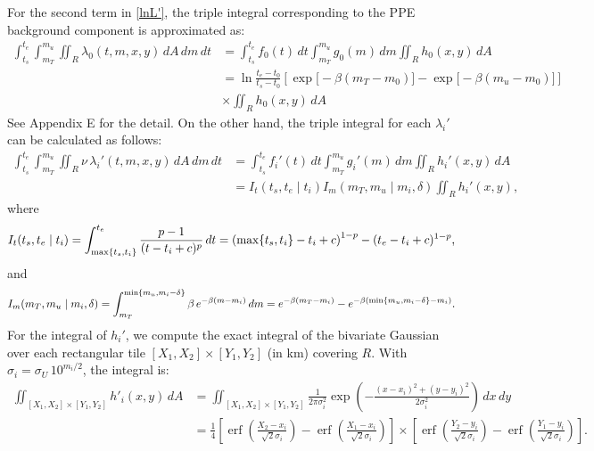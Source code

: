 \documentclass[extra,mreferee]{gji}
\theoremstyle{lemma}
\begin{document}
For the second term in \eqref{lnL'}, the triple integral corresponding to the PPE background component is approximated as:
\begin{equation*}
\begin{aligned}
\int_{t_s}^{t_e} \int_{m_T}^{m_u} \iint_R \lambda_0(t, m, x, y)\, dA\, dm\, dt 
&= \int_{t_s}^{t_e} f_0(t)\, dt \int_{m_T}^{m_u} g_0(m)\, dm \iint_R h_0(x, y)\, dA \\
&= \ln \frac{t_e - t_0}{t_s - t_0} \left[ \exp\!\big[-\beta(m_T - m_0)\big] - \exp\!\big[-\beta(m_u - m_0)\big] \right] \\
& \times \iint_R h_0(x, y)\, dA
\end{aligned}
\end{equation*}
See Appendix E for the detail. On the other hand, the triple integral for each $\lambda_i'$ can be calculated as follows:
\begin{equation*}
\begin{aligned}
    \int_{t_s}^{t_e} \int_{m_T}^{m_u} \iint_R \nu\, \lambda_i'(t, m, x, y)\, dA\, dm\, dt 
    & = \int_{t_s}^{t_e} f_i'(t)\, dt \int_{m_T}^{m_u} g_i'(m)\, dm \iint_R h_i'(x, y)\, dA \\
    & = I_t(t_s, t_e \mid t_i)I_m(m_T, m_u \mid m_i, \delta)\iint_R h_i'(x, y),
\end{aligned}
\end{equation*}
where
\begin{align}    
I_t(t_s, t_e \mid t_i) 
= \int_{\max\{t_s, t_i\}}^{t_e} \frac{p - 1}{(t - t_i + c)^p}\, dt \notag 
= \left(\max\{t_s, t_i\} - t_i + c \right)^{1 - p} - (t_e - t_i + c)^{1 - p},
\end{align}
and
\begin{align}
I_m(m_T, m_u \mid m_i, \delta) 
= \int_{m_T}^{\min\{m_u, m_i - \delta\}} \beta\, e^{-\beta(m - m_i)}\, dm \notag 
= e^{-\beta(m_T - m_i)} - e^{-\beta(\min\{m_u, m_i - \delta\} - m_i)}.
\label{Imj}
\end{align}
For the integral of $h_i'$, we compute the exact integral of the bivariate Gaussian over each rectangular tile $[X_1, X_2] \times [Y_1, Y_2]$ (in km) covering $R$. With $\sigma_i = \sigma_U\, 10^{m_i/2}$, the integral is:
\begin{equation*}
\begin{aligned}
\iint_{[X_1, X_2] \times [Y_1, Y_2]} h'_i(x, y)\, dA 
&= \iint_{[X_1, X_2] \times [Y_1, Y_2]} \frac{1}{2\pi \sigma_i^2} \exp\!\left( -\frac{(x - x_i)^2 + (y - y_i)^2}{2\sigma_i^2} \right)\, dx\, dy \\
&= \frac{1}{4} \left[ \operatorname{erf}\!\left( \frac{X_2 - x_i}{\sqrt{2} \sigma_i} \right) - \operatorname{erf}\!\left( \frac{X_1 - x_i}{\sqrt{2} \sigma_i} \right) \right] \times \left[ \operatorname{erf}\!\left( \frac{Y_2 - y_i}{\sqrt{2} \sigma_i} \right) - \operatorname{erf}\!\left( \frac{Y_1 - y_i}{\sqrt{2} \sigma_i} \right) \right].
\end{aligned}
\end{equation*}
\end{document}
